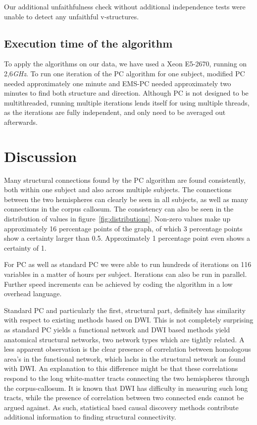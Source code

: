 \documentclass[a4paper, english]{article}
\begin{document}
Our additional unfaithfulness check without additional independence tests were unable to detect any unfaithful v-structures.
 
\subsection{Execution time of the algorithm}
To apply the algorithms on our data, we have used a Xeon E5-2670, running on 2,6\emph{GHz}.
To run one iteration of the PC algorithm for one subject, modified PC needed approximately one minute and EMS-PC needed approximately two minutes to find both structure and direction.
Although PC is not designed to be multithreaded, running multiple iterations lends itself for using multiple threads, as the iterations are fully independent, and only need to be averaged out afterwards.

\section{Discussion}
Many structural connections found by the PC algorithm are found consistently, both within one subject and also across multiple subjects.
The connections between the two hemispheres can clearly be seen in all subjects, as well as many connections in the corpus callosum.
The consistency can also be seen in the distribution of values in figure~\ref{fig:distributions}.
Non-zero values make up approximately 16 percentage points of the graph, of which 3 percentage points show a certainty larger than 0.5.
Approximately 1 percentage point even shows a certainty of 1.


For PC as well as standard PC we were able to run hundreds of iterations on 116 variables in a matter of hours per subject.
Iterations can also be run in parallel.
Further speed increments can be achieved by coding the algorithm in a low overhead language.

Standard PC and particularly the first, structural part, definitely has similarity with respect to existing methods based on DWI.
This is not completely surprising as standard PC yields a functional network and DWI based methods yield anatomical structural networks, two network types which are tightly related.
A less apparent observation is the clear presence of correlation between homologous area's in the functional network, which lacks in the structural network as found with DWI.
An explanation to this difference might be that these correlations respond to the long white-matter tracts connecting the two hemispheres through the corpus-callosum.
It is known that DWI has difficulty in measuring such long tracts, while the presence of correlation between two connected ends cannot be argued against.
As such, statistical baed causal discovery methods contribute additional information to finding structural connectivity.
\end{document}
